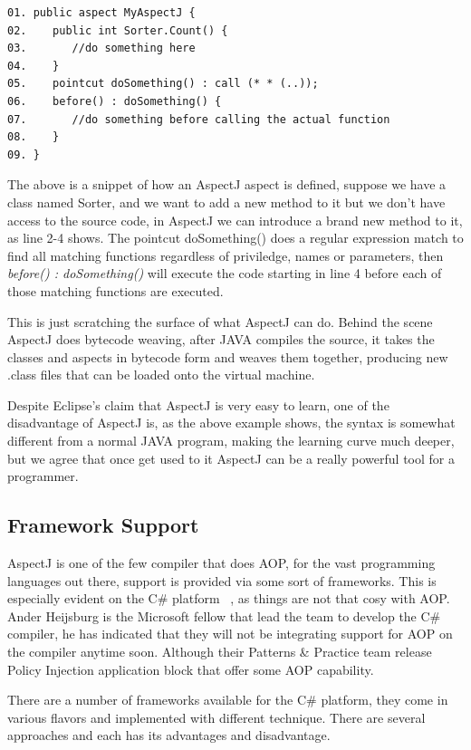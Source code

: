 \begin{verbatim}
01. public aspect MyAspectJ {
02.    public int Sorter.Count() {
03.       //do something here
04.    }
05.    pointcut doSomething() : call (* * (..));
06.    before() : doSomething() {
07.       //do something before calling the actual function
08.    }
09. }
\end{verbatim}

The above is a snippet of how an AspectJ aspect is defined, suppose we have a class named Sorter, and we want to add a new method to it but we don't have access to the source code, in AspectJ we can introduce a brand new method to it, as line 2-4 shows. The pointcut doSomething() does a regular expression match to find all matching functions regardless of priviledge, names or parameters, then {\em before() : doSomething()} will execute the code starting in line 4 before each of those matching functions are executed.

This is just scratching the surface of what AspectJ can do. Behind the scene AspectJ does bytecode weaving, after JAVA compiles the source, it takes the classes and aspects in bytecode form and weaves them together, producing new .class files that can be loaded onto the virtual machine.

Despite Eclipse's claim that AspectJ is very easy to learn, one of the disadvantage of AspectJ is, as the above example shows, the syntax is somewhat different from a normal JAVA program, making the learning curve much deeper, but we agree that once get used to it AspectJ can be a really powerful tool for a programmer.

\subsection{Framework Support}

AspectJ is one of the few compiler that does AOP, for the vast programming languages out there, support is provided via some sort of frameworks. This is especially evident on the C\# platform ~\cite{aopcs}, as things are not that cosy with AOP. Ander Heijsburg is the Microsoft fellow that lead the team to develop the C\# compiler, he has indicated that they will not be integrating support for AOP on the compiler anytime soon. Although their Patterns \& Practice team release Policy Injection application block that offer some AOP capability.

There are a number of frameworks available for the C\# platform, they come in various flavors and implemented with different technique. There are several approaches and each has its advantages and disadvantage.

